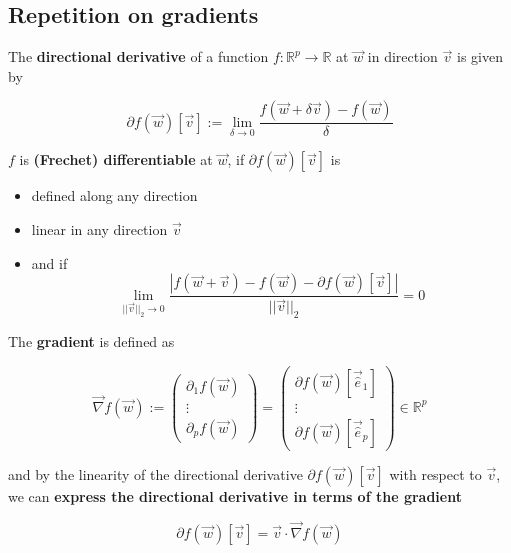 \subsection{Repetition on gradients}
\label{app:gradients}

The \textbf{directional derivative} of a function
$f: \mathbb{R}^p \rightarrow \mathbb{R}$ at 
$\vec{w}$ in direction $\vec{v}$ is given by

\begin{equation}
    \partial f(\vec{w}) [\vec{v}] := \lim_{\delta \to 0} \frac{f(\vec{w} + \delta \vec{v}) - f(\vec{w})}{\delta}
\end{equation}

$f$ is \textbf{(Frechet) differentiable} at $\vec{w}$, if
$\partial f(\vec{w}) [\vec{v}]$ is
\begin{itemize}
    \item defined along any direction
    \item linear in any direction $\vec{v}$
    \item and if
    \begin{equation}
        \lim_{||\vec{v}||_2 \to 0} \frac{|f(\vec{w} + \vec{v}) - f(\vec{w}) - \partial f(\vec{w}) [\vec{v}]|}{||\vec{v}||_2} = 0
    \end{equation}
\end{itemize}

The \textbf{gradient} is defined as

\begin{equation}
    \vec{\nabla} f(\vec{w}):=\left(\begin{array}{c}
    \partial_1 f(\vec{w}) \\
    \vdots \\
    \partial_p f(\vec{w})
    \end{array}\right)=\left(\begin{array}{c}
    \partial f(\vec{w})\left[\vec{\hat{e}}_1\right] \\
    \vdots \\
    \partial f(\vec{w})\left[\vec{\hat{e}}_p\right]
    \end{array}\right) \in \mathbb{R}^p
\end{equation}

and by the linearity of the directional 
derivative $\partial f(\vec{w}) [\vec{v}]$ with respect to $\vec{v}$, we can 
\textbf{express the directional derivative in terms of the gradient}

\begin{equation}
    \partial f(\vec{w}) [\vec{v}] = \vec{v} \cdot \vec{\nabla} f(\vec{w})
\end{equation}

